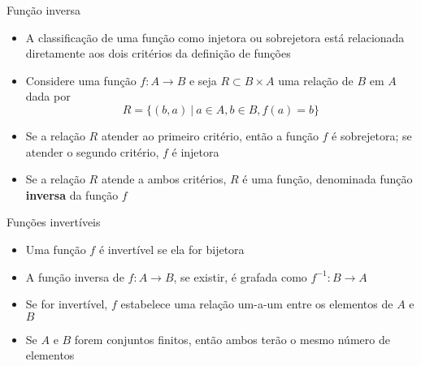 \begin{frame}[fragile]{Função inversa}

    \begin{itemize}
        \item A classificação de uma função como injetora ou sobrejetora está relacionada diretamente aos dois critérios da definição de funções

        \item Considere uma função $f: A\to B$ e seja $R\subset B\times A$ uma relação de $B$ em $A$ dada por 
$$
R = \{(b, a)\ |\ a\in A, b\in B, f(a) = b \}
$$

        \item Se a relação $R$ atender ao primeiro critério, então a função $f$ é sobrejetora; se atender o segundo critério, $f$ é injetora

        \item Se a relação $R$ atende a ambos critérios, $R$ é uma função, denominada função \textbf{inversa} da função $f$
    \end{itemize}

\end{frame}

\begin{frame}[fragile]{Funções invertíveis}

    \begin{itemize}
        \item Uma função $f$ é invertível se ela for bijetora

        \item A função inversa de $f: A\to B$, se existir, é grafada como $f^{-1}: B\to A$

        \item Se for invertível, $f$ estabelece uma relação um-a-um entre os elementos de $A$ e $B$

        \item Se $A$ e $B$ forem conjuntos finitos, então ambos terão o mesmo número de elementos
    \end{itemize}

\end{frame}

